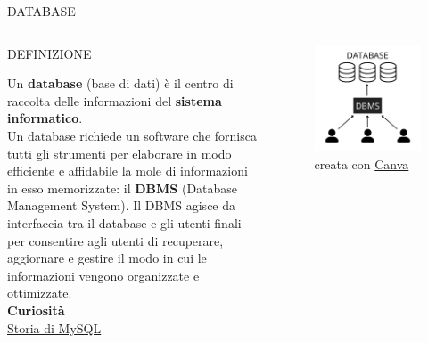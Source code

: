 \documentclass[aspectratio=1610]{beamer}
\begin{document}
\begin{frame}{DATABASE}
    \begin{columns}
            \begin{alertblock}{DEFINIZIONE}
                \begin{minipage}{0.96\linewidth}
                    \justifying
                    Un \textbf{database} (base di dati) è il centro di raccolta delle informazioni del 
                    \textbf{sistema informatico}. \\
                    Un database richiede un software che fornisca tutti 
                    gli strumenti per elaborare in modo efficiente e affidabile 
                    la mole di informazioni in esso memorizzate: il \textbf{DBMS} (Database Management 
                    System). Il DBMS agisce da interfaccia tra il database e gli utenti finali  
                    per consentire agli utenti di recuperare, aggiornare e gestire il modo in cui le informazioni 
                    vengono organizzate e ottimizzate.\\
                    \bigskip
                    \tiny{\textbf{Curiosità}}\\
                    \tiny{\href{https://it.wikipedia.org/wiki/MySQL}{Storia di MySQL}} 
                \end{minipage}
            \end{alertblock}
            \begin{figure}
                \includegraphics[width=\linewidth]{img/dbms.png}
                \caption{{creata con \href{www.canva.com}{Canva}}}
            \end{figure}
    \end{columns}
\end{frame}
\end{document}
